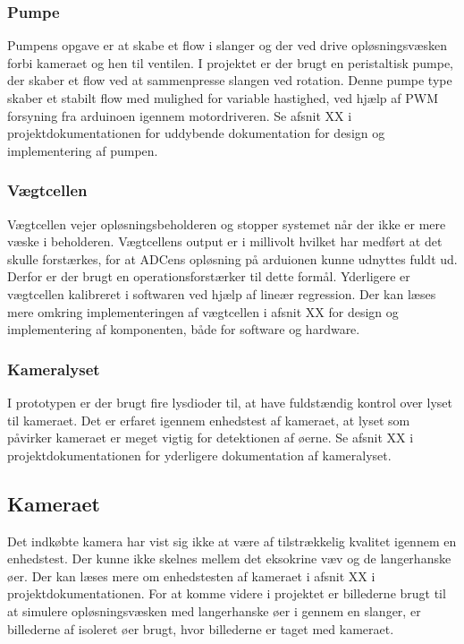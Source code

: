 \subsubsection{Pumpe}
Pumpens opgave er at skabe et flow i slanger og der ved drive opløsningsvæsken forbi kameraet og hen til ventilen. I projektet er der brugt en peristaltisk pumpe, der skaber et flow ved at sammenpresse slangen ved rotation. Denne pumpe type skaber et stabilt flow med mulighed for variable hastighed, ved hjælp af PWM forsyning fra arduinoen igennem motordriveren. Se afsnit XX i projektdokumentationen for uddybende dokumentation for design og implementering af pumpen.

\subsubsection{Vægtcellen}
Vægtcellen vejer opløsningsbeholderen og stopper systemet når der ikke er mere væske i beholderen. Vægtcellens output er i millivolt hvilket har medført at det skulle forstærkes, for at ADCens opløsning på arduionen kunne udnyttes fuldt ud. Derfor er der brugt en operationsforstærker til dette formål. Yderligere er vægtcellen kalibreret i softwaren ved hjælp af lineær regression. Der kan læses mere omkring implementeringen af vægtcellen i afsnit XX for design og implementering af komponenten, både for software og hardware.

\subsubsection{Kameralyset}
I prototypen er der brugt fire lysdioder til, at have fuldstændig kontrol over lyset til kameraet. Det er erfaret igennem enhedstest af kameraet, at lyset som påvirker kameraet er meget vigtig for detektionen af øerne. Se afsnit XX i projektdokumentationen for yderligere dokumentation af kameralyset.

\subsection{Kameraet}
Det indkøbte kamera har vist sig ikke at være af tilstrækkelig kvalitet igennem en enhedstest. Der kunne ikke skelnes mellem det eksokrine væv og de langerhanske øer. Der kan læses mere om enhedstesten af kameraet i afsnit XX i projektdokumentationen. For at komme videre i projektet er billederne brugt til at simulere opløsningsvæsken med langerhanske øer i gennem en slanger, er billederne af isoleret øer brugt, hvor billederne er taget med kameraet.  

